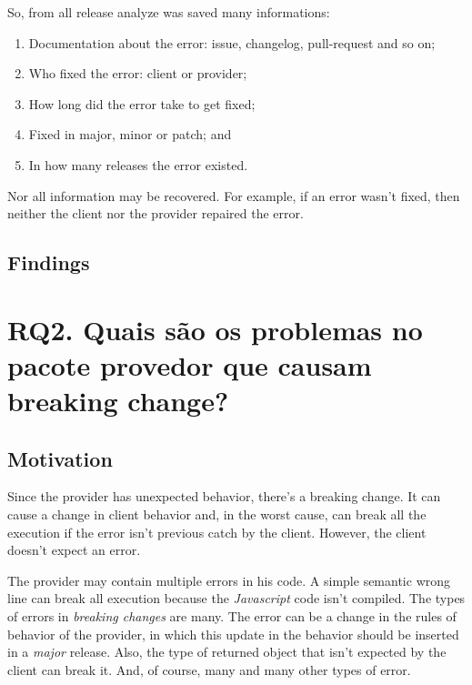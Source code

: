 So, from all release analyze was saved many informations:

\begin{enumerate}
    \item Documentation about the error: issue, changelog, pull-request and so on;
    \item Who fixed the error: client or provider;
    \item How long did the error take to get fixed;
    \item Fixed in major, minor or patch; and
    \item In how many releases the error existed.
\end{enumerate}{}

Nor all information may be recovered. For example, if an error wasn't fixed, then neither the client nor the provider repaired the error.

\subsection{Findings}
\label{fin:rq1}

\section{RQ2. Quais são os problemas no pacote provedor que causam breaking change?}
\label{sec:rq2}

\subsection{Motivation}
\label{mot:rq2}

Since the provider has unexpected behavior, there's a breaking change. It can cause a change in client behavior and, in the worst cause, can break all the execution if the error isn't previous catch by the client. However, the client doesn't expect an error.

The provider may contain multiple errors in his code. A simple semantic wrong line can break all execution because the \textit{Javascript} code isn't compiled. The types of errors in \textit{breaking changes} are many.  The error can be a change in the rules of behavior of the provider, in which this update in the behavior should be inserted in a \textit{major} release. Also, the type of returned object that isn't expected by the client can break it. And, of course, many and many other types of error.


